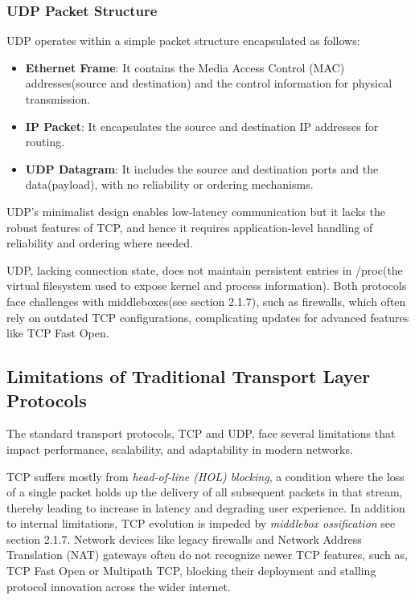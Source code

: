\subsubsection{UDP Packet Structure}

UDP operates within a simple packet structure encapsulated as follows:

\begin{itemize}
    \item \textbf{Ethernet Frame}: It contains the Media Access Control (MAC) addresses(source and destination) and the control information for physical transmission.
    \item \textbf{IP Packet}: It encapsulates the source and destination IP addresses for routing.
    \item \textbf{UDP Datagram}: It includes the source and destination ports and the data(payload), with no reliability or ordering mechanisms.
\end{itemize}

UDP’s minimalist design enables low-latency communication but it lacks the robust features of TCP, and hence it requires application-level handling of reliability and ordering where needed.

UDP, lacking connection state, does not maintain persistent entries in /proc(the virtual filesystem used to expose kernel and process information). Both protocols face challenges with middleboxes(see section 2.1.7), such as firewalls, which often rely on outdated TCP configurations, complicating updates for advanced features like TCP Fast Open.

\subsection{Limitations of Traditional Transport Layer Protocols}

The standard transport protocols, TCP and UDP, face several limitations that impact performance, scalability, and adaptability in modern networks.

TCP suffers mostly from \textit{head-of-line (HOL) blocking}, a condition where the loss of a single packet holds up the delivery of all subsequent packets in that stream, thereby leading to increase in latency and degrading user experience. In addition to internal limitations, TCP evolution is impeded by \textit{middlebox ossification} see section 2.1.7. Network devices like legacy firewalls and Network Address Translation (NAT) gateways often do not recognize newer TCP features, such as, TCP Fast Open or Multipath TCP, blocking their deployment and stalling protocol innovation across the wider internet.

